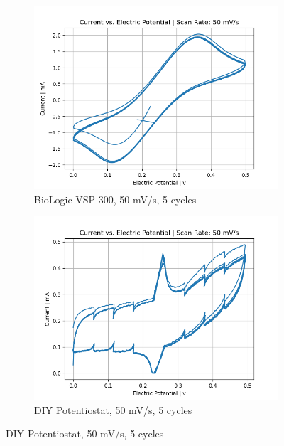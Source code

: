 \documentclass{article}
\begin{document}
\begin{figure}[H]
    \begin{subfigure}[b]{0.45\textwidth}
    \includegraphics[width=\textwidth]{FECN_50mVs_5cycles_lab.png}
    \caption{BioLogic VSP-300, 50 mV/s, 5 cycles}
    \end{subfigure}
    \hfill
    \begin{subfigure}[b]{0.45\textwidth}
    \includegraphics[width=\textwidth]{FECN_50mVs_5cycles.png}
    \caption{DIY Potentiostat, 50 mV/s, 5 cycles}
    \end{subfigure}
    

\end{figure}
\end{document}

